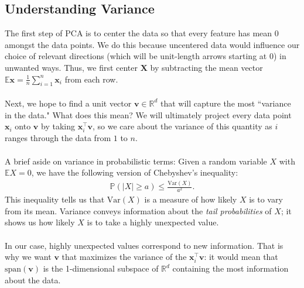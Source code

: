 \documentclass{article}
\begin{document}
\subsection*{Understanding Variance}
The first step of PCA is to center the data so that every feature has mean 0 amongst the data points. We do this because uncentered data would influence our choice of relevant directions (which will be unit-length arrows starting at 0) in unwanted ways. Thus, we first center $\textbf{X}$ by subtracting the mean vector $\mathbb{E}\textbf{x} = \frac{1}{n}\sum_{i = 1}^{n} \textbf{x}_i$ from each row. 
\\ \\
Next, we hope to find a unit vector $\textbf{v} \in \mathbb{R}^d$ that will capture the most ``variance in the data." What does this mean? We will ultimately project every data point $\textbf{x}_i$ onto $\textbf{v}$ by taking $\textbf{x}_i^\top \textbf{v}$, so we care about the variance of this quantity as $i$ ranges through the data from $1$ to $n$.
\\ \\
A brief aside on variance in probabilistic terms: Given a random variable $X$ with $\mathbb{E}X = 0$, we have the following version of Chebyshev's inequality: 
\begin{gather*}
\mathbb{P}(|X| \geq a) \leq \frac{\text{Var}(X)}{a^2}.
\end{gather*}
This inequality tells us that $\text{Var}(X)$ is a measure of how likely $X$ is to vary from its mean. Variance conveys information about the \textit{tail probabilities} of $X$; it shows us how likely $X$ is to take a highly unexpected value. 
\\ \\
In our case, highly unexpected values correspond to new information. That is why we want $\textbf{v}$ that maximizes the variance of the $\textbf{x}_i^\top \textbf{v}$: it would mean that $\text{span}(\textbf{v})$ is the 1-dimensional subspace of $\mathbb{R}^d$ containing the most information about the data.
\end{document}
